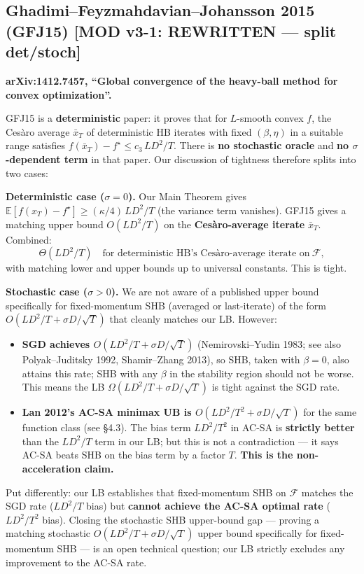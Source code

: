 \documentclass[11pt,a4paper]{article}
\theoremstyle{plain}
\theoremstyle{definition}
\theoremstyle{remark}
\newcommand{\E}{\mathbb{E}}
\newcommand{\F}{\mathcal{F}}
\begin{document}
\subsection{Ghadimi--Feyzmahdavian--Johansson 2015 (GFJ15) \textbf{[MOD v3-1: REWRITTEN --- split det/stoch]}}

\textbf{arXiv:1412.7457, ``Global convergence of the heavy-ball method for convex optimization''.}

GFJ15 is a \textbf{deterministic} paper: it proves that for $L$-smooth convex $f$, the Ces\`aro average $\bar x_T$ of deterministic HB iterates with fixed $(\beta,\eta)$ in a suitable range satisfies $f(\bar x_T) - f^\star \leq c_3\, LD^2/T$. There is \textbf{no stochastic oracle} and \textbf{no $\sigma$-dependent term} in that paper. Our discussion of tightness therefore splits into two cases:

\textbf{Deterministic case ($\sigma = 0$).} Our Main Theorem gives $\E[f(x_T) - f^\star] \geq (\kappa/4)\,LD^2/T$ (the variance term vanishes). GFJ15 gives a matching upper bound $O(LD^2/T)$ on the \textbf{Ces\`aro-average iterate} $\bar x_T$. Combined:
\[
\Theta(LD^2/T)\quad \text{for deterministic HB's Ces\`aro-average iterate on}\ \F,
\]
with matching lower and upper bounds up to universal constants. This is tight.

\textbf{Stochastic case ($\sigma > 0$).} We are not aware of a published upper bound specifically for fixed-momentum SHB (averaged or last-iterate) of the form $O(LD^2/T + \sigma D/\sqrt T)$ that cleanly matches our LB. However:
\begin{itemize}
\item \textbf{SGD achieves $O(LD^2/T + \sigma D/\sqrt T)$} (Nemirovski--Yudin 1983; see also Polyak--Juditsky 1992, Shamir--Zhang 2013), so SHB, taken with $\beta = 0$, also attains this rate; SHB with any $\beta$ in the stability region should not be worse. This means the LB $\Omega(LD^2/T + \sigma D/\sqrt T)$ is tight against the SGD rate.
\item \textbf{Lan 2012's AC-SA minimax UB is $O(LD^2/T^2 + \sigma D/\sqrt T)$} for the same function class (see \S4.3). The bias term $LD^2/T^2$ in AC-SA is \textbf{strictly better} than the $LD^2/T$ term in our LB; but this is not a contradiction --- it says AC-SA beats SHB on the bias term by a factor $T$. \textbf{This is the non-acceleration claim.}
\end{itemize}

Put differently: our LB establishes that fixed-momentum SHB on $\F$ matches the SGD rate ($LD^2/T$ bias) but \textbf{cannot achieve the AC-SA optimal rate} ($LD^2/T^2$ bias). Closing the stochastic SHB upper-bound gap --- proving a matching stochastic $O(LD^2/T + \sigma D/\sqrt T)$ upper bound specifically for fixed-momentum SHB --- is an open technical question; our LB strictly excludes any improvement to the AC-SA rate.
\end{document}
